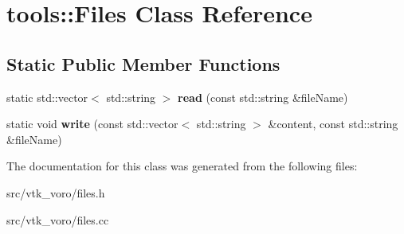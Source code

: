 \hypertarget{classtools_1_1Files}{}\section{tools\+:\+:Files Class Reference}
\label{classtools_1_1Files}
\subsection*{Static Public Member Functions}
\begin{DoxyCompactItemize}
\item 
static std\+::vector$<$ std\+::string $>$ {\bfseries read} (const std\+::string \&file\+Name)\hypertarget{classtools_1_1Files_ad40d990d6e6d8157235869207516501e}{}\label{classtools_1_1Files_ad40d990d6e6d8157235869207516501e}

\item 
static void {\bfseries write} (const std\+::vector$<$ std\+::string $>$ \&content, const std\+::string \&file\+Name)\hypertarget{classtools_1_1Files_acea9051ade9be1e8c8cd0f8b0099708e}{}\label{classtools_1_1Files_acea9051ade9be1e8c8cd0f8b0099708e}

\end{DoxyCompactItemize}


The documentation for this class was generated from the following files\+:\begin{DoxyCompactItemize}
\item 
src/vtk\+\_\+voro/files.\+h\item 
src/vtk\+\_\+voro/files.\+cc\end{DoxyCompactItemize}
